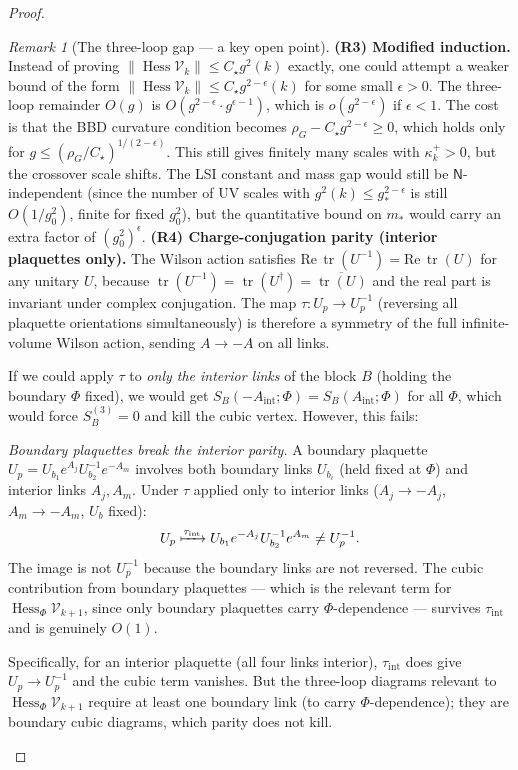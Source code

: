 \documentclass[11pt,a4paper]{article}
\theoremstyle{plain}
\theoremstyle{definition}
\theoremstyle{remark}
\newtheorem{remark}[theorem]{Remark}
\newcommand{\tr}{\operatorname{tr}}
\newcommand{\Hess}{\operatorname{Hess}}
\newcommand{\cV}{\mathcal{V}}
\begin{document}
\begin{proof}
\begin{remark}[The three-loop gap --- a key open point]
\textbf{(R3) Modified induction.}
Instead of proving $\|\Hess\cV_k\| \le C_\star g^2(k)$
exactly, one could attempt a weaker bound of the form
$\|\Hess\cV_k\| \le C_\star g^{2-\epsilon}(k)$ for
some small $\epsilon > 0$. The three-loop remainder
$O(g)$ is $O(g^{2-\epsilon} \cdot g^{\epsilon-1})$,
which is $o(g^{2-\epsilon})$ if $\epsilon < 1$. The cost
is that the BBD curvature condition becomes
$\rho_G - C_\star g^{2-\epsilon} \ge 0$, which holds
only for $g \le (\rho_G/C_\star)^{1/(2-\epsilon)}$.
This still gives finitely many scales with
$\kappa_k^+ > 0$, but the crossover scale shifts.
The LSI constant and mass gap would still be
$\mathsf{N}$-independent (since the number of UV scales
with $g^2(k) \le g_{*}^{2-\epsilon}$ is still $O(1/g_0^2)$,
finite for fixed $g_0^2$), but the quantitative bound on
$m_*$ would carry an extra factor of $(g_0^2)^\epsilon$.
\textbf{(R4) Charge-conjugation parity (interior plaquettes only).}
The Wilson action satisfies $\mathrm{Re}\,\tr(U^{-1})
= \mathrm{Re}\,\tr(U)$ for any unitary $U$, because
$\tr(U^{-1}) = \tr(U^\dagger) = \overline{\tr(U)}$ and
the real part is invariant under complex conjugation.
The map $\tau: U_p \to U_p^{-1}$
(reversing all plaquette orientations simultaneously)
is therefore a symmetry of the full infinite-volume
Wilson action, sending $A \to -A$ on all links.

If we could apply $\tau$ to \emph{only the interior links}
of the block $B$ (holding the boundary $\Phi$ fixed),
we would get $S_B(-A_{\mathrm{int}}; \Phi) = S_B(A_{\mathrm{int}};\Phi)$
for all $\Phi$, which would force $S_B^{(3)} = 0$ and
kill the cubic vertex. However, this fails:

\emph{Boundary plaquettes break the interior parity.}
A boundary plaquette $U_p = U_{b_1} e^{A_j} U_{b_2}^{-1} e^{-A_m}$
involves both boundary links $U_{b_i}$ (held fixed at $\Phi$)
and interior links $A_j, A_m$. Under $\tau$ applied only
to interior links ($A_j \to -A_j$, $A_m \to -A_m$, $U_b$ fixed):
\[
  U_p \xmapsto{\tau_{\mathrm{int}}}
  U_{b_1} e^{-A_j} U_{b_2}^{-1} e^{A_m}
  \ne U_p^{-1}.
\]
The image is not $U_p^{-1}$ because the boundary links
are not reversed. The cubic contribution from boundary
plaquettes --- which is the relevant term for
$\Hess_\Phi \cV_{k+1}$, since only boundary plaquettes
carry $\Phi$-dependence --- survives $\tau_{\mathrm{int}}$
and is genuinely $O(1)$.

Specifically, for an interior plaquette (all four links
interior), $\tau_{\mathrm{int}}$ does give $U_p \to U_p^{-1}$
and the cubic term vanishes. But the three-loop diagrams
relevant to $\Hess_\Phi \cV_{k+1}$ require at least
one boundary link (to carry $\Phi$-dependence); they
are boundary cubic diagrams, which parity does not kill.


\end{remark}
\end{proof}
\end{document}
